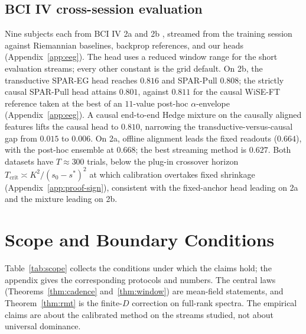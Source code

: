 \documentclass[10pt]{article}
\begin{document}
\subsection{BCI IV cross-session evaluation}
\label{sec:eeg}
Nine subjects each from BCI IV 2a \citep{brunner2008bci2a,tangermann2012bci} and 2b \citep{leeb2008bci2b}, streamed from the training session against Riemannian baselines, backprop references, and our heads (Appendix~\ref{app:eeg}).
The head uses a reduced window range for the short evaluation streams; every other constant is the grid default.
On 2b, the transductive SPAR-EG head reaches $0.816$ and SPAR-Pull $0.808$; the strictly causal SPAR-Pull head attains $0.801$, against $0.811$ for the causal WiSE-FT reference taken at the best of an $11$-value post-hoc $\alpha$-envelope (Appendix~\ref{app:eeg}). A causal end-to-end Hedge mixture on the causally aligned features lifts the causal head to $0.810$, narrowing the transductive-versus-causal gap from $0.015$ to $0.006$.
On 2a, offline alignment leads the fixed readouts ($0.664$), with the post-hoc ensemble at $0.668$; the best streaming method is $0.627$. Both datasets have $T \approx 300$ trials, below the plug-in crossover horizon $T_{\mathrm{crit}} \asymp K^2/(s_0 - s^*)^2$ at which calibration overtakes fixed shrinkage (Appendix~\ref{app:proof-sign}), consistent with the fixed-anchor head leading on 2a and the mixture leading on 2b.

\section{Scope and Boundary Conditions}
\label{sec:limitations}
Table~\ref{tab:scope} collects the conditions under which the claims hold; the appendix gives the corresponding protocols and numbers.
The central laws (Theorems~\ref{thm:cadence} and~\ref{thm:window}) are mean-field statements, and Theorem~\ref{thm:rmt} is the finite-$D$ correction on full-rank spectra.
The empirical claims are about the calibrated method on the streams studied, not about universal dominance.
\end{document}
